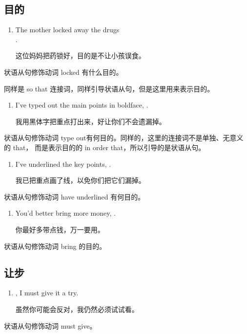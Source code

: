 \subsection{目的}

\begin{enumerate}
\item The mother locked away the drugs  \\
  .

  这位妈妈把药锁好，目的是不让小孩误食。
\end{enumerate}
状语从句修饰动词 locked 有什么目的。

同样是 so that 连接词，同样引导状语从句，但是这里用来表示目的。

\begin{enumerate}[resume]
\item I've typed out the main points in boldface, 
  .

  我用黑体字把重点打出来，好让你们不会遗漏掉。
\end{enumerate}
状语从句修饰动词 type out有何目的。同样的，这里的连接词不是单独、无意义的 that，
而是表示目的的 in order that，所以引导的是状语从句。

\begin{enumerate}[resume]
\item I've underlined the key points,  .

  我已把重点画了线，以免你们把它们漏掉。
\end{enumerate}
状语从句修饰动词 have underlined 有何目的。

\begin{enumerate}[resume]
\item You'd better bring more money,  .

  你最好多带点钱，万一要用。
\end{enumerate}
状语从句修饰动词 bring 的目的。

\subsection{让步}

\begin{enumerate}
\item {} , I must give it a
  try.

  虽然你可能会反对，我仍然必须试试看。
\end{enumerate}
状语从句修饰动词 must give。

